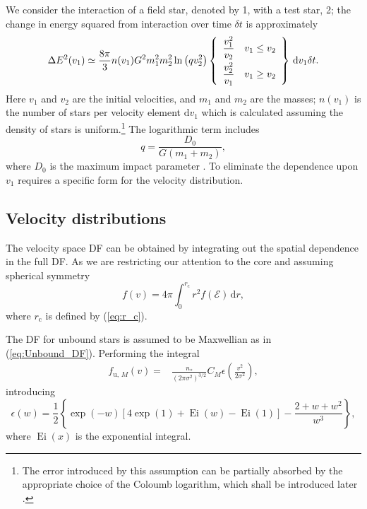 \documentclass[useAMS,usedcolumn,usegraphicx,usenatbib]{mn2e}
\newcommand{\eqnref}[1]{(\ref{eq:#1})}
\DeclareMathOperator{\Ei}{Ei}
\newcommand{\sub}[1]{\ensuremath{_\mathrm{#1}}}
\newcommand{\dd}{\ensuremath{\mathrm{d}}}
\newcommand{\intd}[4]{\ensuremath{\displaystyle \int_{#1}^{#2}{#3}\,\dd{#4}}}
\newcommand{\recip}[1]{\ensuremath{\dfrac{1}{#1}}}
\begin{document}
\begin{onecolumn}
We consider the interaction of a field star, denoted by 1, with a test star, 2; the change in energy squared from interaction over time $\delta t$ is approximately \citep[chapter 2]{Chandrasekhar1960}
\begin{equation}
\Delta E^2(v_1) \simeq \frac{8\pi}{3} n(v_1)G^2m_1^2 m_2^2\ln\left(qv_2^2\right)\left\{\begin{array}{lr}\dfrac{v_1^2}{v_2}\vspace{1.0mm} & v_1 \leq v_2\\ \dfrac{v_2^2}{v_1} & v_1 \geq v_2 \end{array}\right\}\,\dd v_1\delta t.
\end{equation}
Here $v_1$ and $v_2$ are the initial velocities, and $m_1$ and $m_2$ are the masses; $n(v_1)$ is the number of stars per velocity element $\dd v_1$ which is calculated assuming the density of stars is uniform.\footnote{The error introduced by this assumption can be partially absorbed by the appropriate choice of the Coloumb logarithm, which shall be introduced later \citep{Just2011}.} The logarithmic term includes
\begin{equation}
q = \frac{D_0}{G\left(m_1+m_2\right)},
\end{equation}
where $D_0$ is the maximum impact parameter \citep{Weinberg1986}. To eliminate the dependence upon $v_1$ requires a specific form for the velocity distribution.

\subsection{Velocity distributions}

The velocity space DF can be obtained by integrating out the spatial dependence in the full DF. As we are restricting our attention to the core and assuming spherical symmetry
\begin{equation}
f(v) = 4\pi\intd{0}{r\sub{c}}{r^2f(\mathcal{E})}{r},
\end{equation}
where $r\sub{c}$ is defined by \eqnref{r_c}.

The DF for unbound stars is assumed to be Maxwellian as in \eqnref{Unbound_DF}. Performing the integral
\begin{align}
f_{\mathrm{u},\,M}(v) = {} & \frac{n_\ast}{\left(2\pi\sigma^2\right)^{3/2}}C_M\epsilon\left(\frac{v^2}{2\sigma^2}\right),
\end{align}
introducing
\begin{equation}
\epsilon(w) = \recip{2}\left\{\exp(-w)\left[4\exp(1) + \Ei(w) - \Ei(1)\right] - \frac{2 + w + w^2}{w^3}\right\},
\end{equation}
where $\Ei(x)$ is the exponential integral.


\end{onecolumn}
\end{document}

